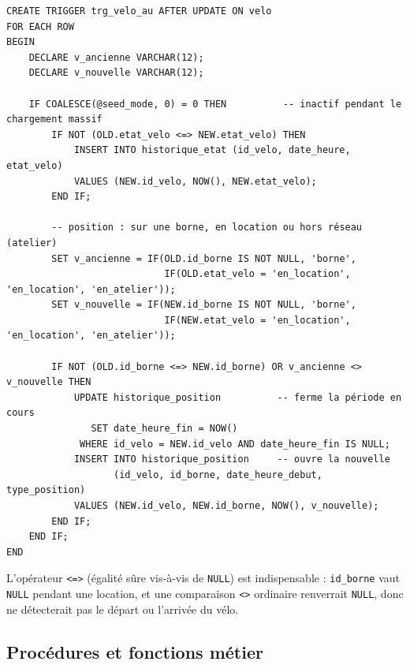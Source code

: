 \begin{lstlisting}[style=sql]
CREATE TRIGGER trg_velo_au AFTER UPDATE ON velo
FOR EACH ROW
BEGIN
    DECLARE v_ancienne VARCHAR(12);
    DECLARE v_nouvelle VARCHAR(12);

    IF COALESCE(@seed_mode, 0) = 0 THEN          -- inactif pendant le chargement massif
        IF NOT (OLD.etat_velo <=> NEW.etat_velo) THEN
            INSERT INTO historique_etat (id_velo, date_heure, etat_velo)
            VALUES (NEW.id_velo, NOW(), NEW.etat_velo);
        END IF;

        -- position : sur une borne, en location ou hors réseau (atelier)
        SET v_ancienne = IF(OLD.id_borne IS NOT NULL, 'borne',
                            IF(OLD.etat_velo = 'en_location', 'en_location', 'en_atelier'));
        SET v_nouvelle = IF(NEW.id_borne IS NOT NULL, 'borne',
                            IF(NEW.etat_velo = 'en_location', 'en_location', 'en_atelier'));

        IF NOT (OLD.id_borne <=> NEW.id_borne) OR v_ancienne <> v_nouvelle THEN
            UPDATE historique_position          -- ferme la période en cours
               SET date_heure_fin = NOW()
             WHERE id_velo = NEW.id_velo AND date_heure_fin IS NULL;
            INSERT INTO historique_position     -- ouvre la nouvelle
                   (id_velo, id_borne, date_heure_debut, type_position)
            VALUES (NEW.id_velo, NEW.id_borne, NOW(), v_nouvelle);
        END IF;
    END IF;
END
\end{lstlisting}

L'opérateur \texttt{<=>} (égalité sûre vis-à-vis de \texttt{NULL}) est indispensable : \texttt{id\_borne} vaut \texttt{NULL} pendant une location, et une comparaison \texttt{<>} ordinaire renverrait \texttt{NULL}, donc ne détecterait pas le départ ou l'arrivée du vélo.

\subsection{Procédures et fonctions métier}

